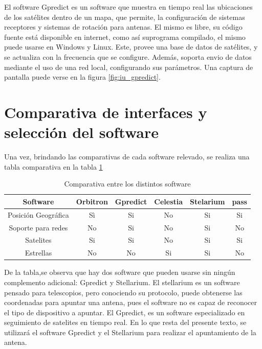 El software Gpredict es un software que muestra en tiempo real las ubicaciones de los satélites dentro de un mapa, que permite, la configuración de sistemas receptores y sistemas de rotación para antenas. El mismo es libre, su código fuente está disponible en internet, como así suprograma compilado, el mismo puede usarse en Windows y Linux. Este, provee una base de datos de satélites, y se actualiza con la frecuencia que se configure. Además, soporta envio de datos mediante el uso de una red local, configurando sus parámetros. Una captura de pantalla puede verse en la figura \ref{fig:iu_gpredict}.



\section{Comparativa de interfaces y selección del software}
Una vez, brindando las comparativas de cada software relevado, se realiza una tabla comparativa en la tabla \ref{tab:comp_soft}
\begin{table}[h]
	\centering
	\begin{tabular}{|c|c|c|c|c|c|}
		\hline
		Software 			& Orbitron & Gpredict & Celestia & Stelarium & pass\\ 
		\hline
		Posición Geográfica & Sì 	   & Si 	  & No 		 & Si        & Si  \\
		\hline
		Soporte para redes  & No 	   & Si       & No       & Si        & No  \\
		\hline
		Satelites 			& Si 	   & Si		  & No		 & Si		 & Si  \\
		\hline
		Estrellas 			& No	   & No		  &Si		 & Si		 & No  \\
		\hline	
\end{tabular}
\caption{Comparativa entre los distintos software} 
\label{tab:comp_soft}
\end{table}

De la tabla,se  observa que hay dos software que pueden usarse sin ningún complemento adicional: Gpredict y Stellarium. El stellarium es un software pensado para telescopios, pero conociendo su protocolo, puede obtenerse las coordenadas para apuntar una antena, pues el software no es capaz de reconocer el tipo de dispositivo a apuntar. El Gpredict, es un software especializado en seguimiento de satelites en tiempo real. En lo que resta del presente texto, se utilizará el software Gpredict y el Stellarium para realizar el apuntamiento de la antena. 
 


